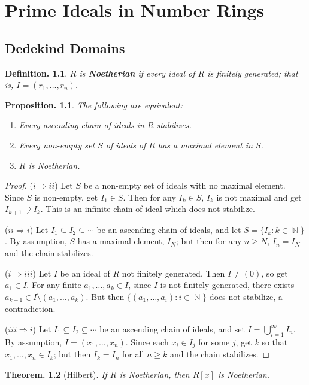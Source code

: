 \documentclass[11pt, a4paper]{memoir}
\DeclareMathOperator{\N}{{\mathbb{N}}}
\newcommand{\imp}[2]{($#1\Rightarrow#2$)\hspace{0.2cm}}
\theoremstyle{change}
\newtheorem{theorem}{Theorem.}[section]
\newtheorem{proposition}[theorem]{Proposition.}
\theoremstyle{plain}
\theoremstyle{nonumberplain}
\newtheorem{definition}{Definition.}
\newtheorem{proof}{Proof}
\newcommand{\mbf}[1]{{\boldmath\bfseries #1}}
\numberwithin{equation}{section}
\begin{document}
\chapter{Prime Ideals in Number Rings}
\section{Dedekind Domains}
\begin{definition}
    $R$ is \mbf{Noetherian} if every ideal of $R$ is finitely generated; that is, $I=(r_1,\ldots,r_n)$.
\end{definition}
\begin{proposition}\label{thm:noe}
    The following are equivalent:
    \begin{enumerate}[nl,r]
        \item Every ascending chain of ideals in $R$ stabilizes.
        \item Every non-empty set $S$ of ideals of $R$ has a maximal element in $S$.
        \item $R$ is Noetherian.
    \end{enumerate}
\end{proposition}
\begin{proof}
    \imp{i}{ii}
    Let $S$ be a non-empty set of ideals with no maximal element.
    Since $S$ is non-empty, get $I_1\in S$.
    Then for any $I_k\in S$, $I_k$ is not maximal and get $I_{k+1}\supsetneq I_k$.
    This is an infinite chain of ideal which does not stabilize.

    \imp{ii}{i}
    Let $I_1\subseteq I_2\subseteq\cdots$ be an ascending chain of ideals, and let $S=\{I_k:k\in\N\}$.
    By assumption, $S$ has a maximal element, $I_N$; but then for any $n\geq N$, $I_n=I_N$ and the chain stabilizes.

    \imp{i}{iii}
    Let $I$ be an ideal of $R$ not finitely generated.
    Then $I\neq(0)$, so get $a_1\in I$.
    For any finite $a_1,\ldots,a_k\in I$, since $I$ is not finitely generated, there exists $a_{k+1}\in I\setminus(a_1,\ldots,a_k)$.
    But then $\{(a_1,\ldots,a_i):i\in\N\}$ does not stabilize, a contradiction.

    \imp{iii}{i}
    Let $I_1\subseteq I_2\subseteq\cdots$ be an ascending chain of ideals, and set $I=\bigcup_{i=1}^\infty I_n$.
    By assumption, $I=(x_1,\ldots,x_n)$.
    Since each $x_i\in I_j$ for some $j$, get $k$ so that $x_1,\ldots,x_n\in I_k$; but then $I_k=I_n$ for all $n\geq k$ and the chain stabilizes.
\end{proof}
\begin{theorem}[Hilbert]
    If $R$ is Noetherian, then $R[x]$ is Noetherian.
\end{theorem}
\end{document}
